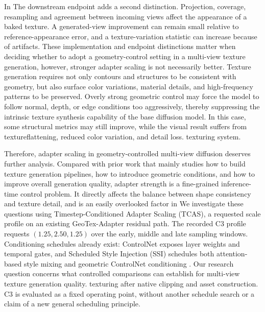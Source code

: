 \documentclass[times,twocolumn,final]{elsarticle}
\providecommand{\DIFadd}[1]{{\protect\color{blue} \sf #1}} %
\providecommand{\DIFdel}[1]{{\protect\color{red} \scriptsize #1}} %
\providecommand{\DIFaddbegin}{} %
\providecommand{\DIFaddend}{} %
\providecommand{\DIFdelbegin}{} %
\providecommand{\DIFdelend}{} %
\begin{document}
\DIFdelbegin \DIFdel{In }\DIFdelend \DIFaddbegin \DIFadd{The downstream endpoint adds a second distinction. Projection, coverage, resampling and agreement between incoming views affect the appearance of a baked texture. A generated-view improvement can remain small relative to reference-appearance error, and a texture-variation statistic can increase because of artifacts. These implementation and endpoint distinctions matter when deciding whether to adopt a geometry-control setting in a }\DIFaddend multi-view \DIFdelbegin \DIFdel{texture generation, however, stronger adapter scaling is not necessarily better. Texture generation requires not only contours and structures to be consistent with geometry, but also surface color variations, material details, and high-frequency patterns to be preserved. Overly strong geometric control may force the model to follow normal, depth, or edge conditions too aggressively, thereby suppressing the intrinsic texture synthesis capability of the base diffusion model. In this case, some structural metrics may still improve, while the visual result suffers from textureflattening, reduced color variation, and detail loss.
}\DIFdelend \DIFaddbegin \DIFadd{texturing system.
}\DIFaddend 

\DIFdelbegin \DIFdel{Therefore, adapter scaling in geometry-controlled multi-view diffusion deserves further analysis. Compared with prior work that mainly studies how to build texture generation pipelines, how to introduce geometric conditions, and how to improve overall generation quality, adapter strength is a fine-grained inference-time control problem. It directly affects the balance between shape consistency and texture detail, and is an easily overlooked factor in }\DIFdelend \DIFaddbegin \DIFadd{We investigate these questions using Timestep-Conditioned Adapter Scaling (TCAS), a requested scale profile on an existing GeoTex-Adapter residual path. The recorded C3 profile requests $(1.25,2.50,1.25)$ over the early, middle and late sampling windows. Conditioning schedules already exist: ControlNet exposes layer weights and temporal gates, and Scheduled Style Injection (SSI) schedules both attention-based style mixing and geometric ControlNet conditioning \cite{controlnet2023layercontrol,diffusers2023controlnet,kulkarni2026ssi}. Our research question concerns what controlled comparisons can establish for }\DIFaddend multi-view \DIFdelbegin \DIFdel{texture generation quality.
}\DIFdelend \DIFaddbegin \DIFadd{texturing after native clipping and asset construction. C3 is evaluated as a fixed operating point, without another schedule search or a claim of a new general scheduling principle.
}\DIFaddend 
\end{document}
